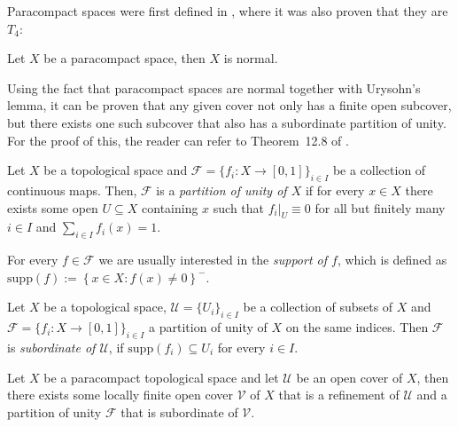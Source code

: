 Paracompact spaces were first defined in \cite{paracompactness}, where it was also proven that they are $T_4$:
\begin{theorem}[Dieudonn\'e] Let $X$ be a paracompact space, then $X$ is normal.
\end{theorem}

Using the fact that paracompact spaces are normal together with Urysohn's lemma, it can be proven that any given cover not only has a finite open subcover, but there exists one such subcover that also has a subordinate partition of unity. For the proof of this, the reader can refer to Theorem~12.8 of \cite{bredon}.
\begin{definition} Let $X$ be a topological space and $\mathcal{F}=\{f_i:X\to[0,1]\}_{i\in I}$ be a collection of continuous maps. Then, $\mathcal{F}$ is a \emph{partition of unity of $X$} if for every $x\in X$ there exists some open $U\subseteq X$ containing $x$ such that $f_i|_U\equiv0$ for all but finitely many $i\in I$ and $\sum_{i\in I}f_i(x)=1$.
\end{definition}
\begin{remark} For every $f\in\mathcal{F}$ we are usually interested in the \emph{support of $f$}, which is defined as $\mathrm{supp}(f):=\left\{x\in X:f(x)\neq0\right\}^-$.
\end{remark}
\begin{definition} Let $X$ be a topological space, $\mathcal{U}=\{U_i\}_{i\in I}$ be a collection of subsets of $X$ and $\mathcal{F}=\{f_i:X\to[0,1]\}_{i\in I}$ a partition of unity of $X$ on the same indices. Then $\mathcal{F}$ is \emph{subordinate of $\mathcal{U}$}, if $\mathrm{supp}(f_i)\subseteq U_i$ for every $i\in I$.
\end{definition}
\begin{theorem}\label{thm:paracompact_partition_of_unity} Let $X$ be a paracompact topological space and let $\mathcal{U}$ be an open cover of $X$, then there exists some locally finite open cover $\mathcal{V}$ of $X$ that is a refinement of $\mathcal{U}$ and a partition of unity $\mathcal{F}$ that is subordinate of $\mathcal{V}$.
\end{theorem}


